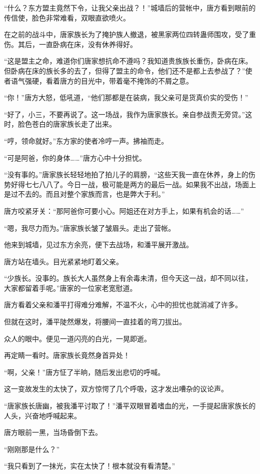 \begin{this_body}
“什么？东方盟主竟然下令，让我父亲出战？！”城墙后的营帐中，唐方看到眼前的传信使，脸色非常难看，双眼直欲喷火。

在之前的战斗中，唐家族长为了掩护族人撤退，被黑家两位四转蛊师围攻，受了重伤。其后，一直卧病在床，没有休养得好。

“这是盟主之命，难道你们唐家想抗命不遵吗？我知道贵族族长重伤，卧病在床。但卧病在床的族长多的去了，但得了盟主的命令，他们还不是都上去参战了？”使者语气强硬，看着唐方的目光中，带着毫不掩饰的不屑之意。

“你！”唐方大怒，低吼道，“他们那都是在装病，我父亲可是货真价实的受伤！”

“好了，小三，不要再说了。这一场战，我作为唐家族长。亲自参战责无旁贷。”这时，脸色苍白的唐家族长走了出来。

“哼，领命就好。”东方家的使者冷哼一声。拂袖而走。

“可是阿爸，你的身体……”唐方心中十分担忧。

“没有事的。”唐家族长轻轻地拍了拍儿子的肩膀，“这些天我一直在休养，身上的伤势好得七七八八了。今日一战，极可能是两方的最后一战。如果我不出战，场面上是过不去的。而且对整个家族而言，也是弊大于利。”

唐方咬紧牙关：“那阿爸你可要小心。阿姐还在对方手上，如果有机会的话……”

“嗯，我尽力而为。”唐家族长皱了皱眉头。走出了营帐。

他来到城墙，见过东方余亮，便下去战场，和潘平展开激战。

唐方站在墙头。目光紧紧地盯着父亲。

“少族长。没事的。族长大人虽然身上有余毒未清，但今天这一战，却不同以往，大家都留着手呢。”唐家的一位家老宽慰道。

唐方看着父亲和潘平打得难分难解，不温不火，心中的担忧也就消减了许多。

但就在这时，潘平陡然爆发，将腰间一直挂着的弯刀拔出。

众人的眼中。便见一道闪亮的白光，一晃即逝。

再定睛一看时。唐家族长竟然身首异处！

“啊，父亲！”唐方怔了半晌，随后发出悲切的呼喊。

这一变故发生的太快了，双方惊愕了几个呼吸，这才发出嘈杂的议论声。

“唐家族长唐幽，被我潘平讨取了！”潘平双眼冒着嗜血的光，一手提起唐家族长的人头，兴奋地呼喊起来。

唐方眼前一黑，当场昏倒下去。

“刚刚那是什么？”

“我只看到了一抹光，实在太快了！根本就没有看清楚。”


\end{this_body}
